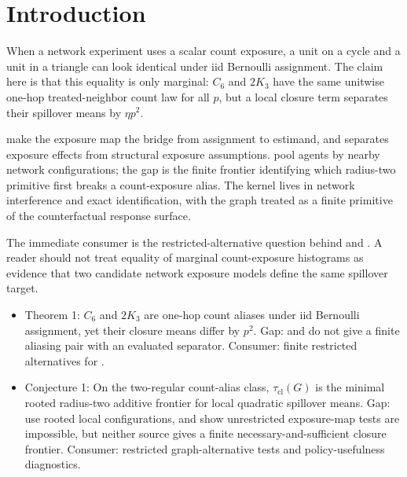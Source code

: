 \documentclass[11pt]{article}
\theoremstyle{definition}
\theoremstyle{plain}
\theoremstyle{remark}
\begin{document}
\section{Introduction}
When a network experiment uses a scalar count exposure, a unit on a cycle and a unit in a triangle can look identical under iid Bernoulli assignment. The claim here is that this equality is only marginal: \(C_6\) and \(2K_3\) have the same unitwise one-hop treated-neighbor count law for all \(p\), but a local closure term separates their spillover means by \(\eta p^2\).

\citet[\S2, exposure mappings]{aronow_samii_2017_general_interference} make the exposure map the bridge from assignment to estimand, and \citet[\S2--\S3]{savje_2024_misspecified_exposure} separates exposure effects from structural exposure assumptions. \citet[abstract and \S2, rooted configurations]{auerbach_guo_tabordmeehan_2026_local_approach} pool agents by nearby network configurations; the gap is the finite frontier identifying which radius-two primitive first breaks a count-exposure alias. The kernel lives in network interference and exact identification, with the graph treated as a finite primitive of the counterfactual response surface.

The immediate consumer is the restricted-alternative question behind \citet{hoshino_yanagi_2023_specification_test} and \citet{gao_harshaw_savje_wang_2026_impossibility_testing}. A reader should not treat equality of marginal count-exposure histograms as evidence that two candidate network exposure models define the same spillover target.

\begin{itemize}[leftmargin=*]
\item Theorem 1: \(C_6\) and \(2K_3\) are one-hop count aliases under iid Bernoulli assignment, yet their closure means differ by \(p^2\). Gap: \citet{aronow_samii_2017_general_interference} and \citet{savje_2024_misspecified_exposure} do not give a finite aliasing pair with an evaluated separator. Consumer: finite restricted alternatives for \citet{hoshino_yanagi_2023_specification_test}.
\item Conjecture 1: On the two-regular count-alias class, \(\tau_{\mathrm{cl}}(G)\) is the minimal rooted radius-two additive frontier for local quadratic spillover means. Gap: \citet[abstract and \S2]{auerbach_guo_tabordmeehan_2026_local_approach} use rooted local configurations, and \citet{gao_harshaw_savje_wang_2026_impossibility_testing} show unrestricted exposure-map tests are impossible, but neither source gives a finite necessary-and-sufficient closure frontier. Consumer: restricted graph-alternative tests and policy-usefulness diagnostics.
\end{itemize}
\end{document}
